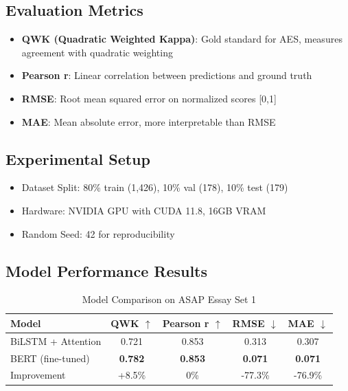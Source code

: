 \documentclass[12pt,a4paper]{article}
\begin{document}
\subsection{Evaluation Metrics}
\begin{itemize}
    \item \textbf{QWK (Quadratic Weighted Kappa)}: Gold standard for AES, measures agreement with quadratic weighting
    \item \textbf{Pearson r}: Linear correlation between predictions and ground truth
    \item \textbf{RMSE}: Root mean squared error on normalized scores [0,1]
    \item \textbf{MAE}: Mean absolute error, more interpretable than RMSE
\end{itemize}

\subsection{Experimental Setup}
\begin{itemize}
    \item Dataset Split: 80\% train (1,426), 10\% val (178), 10\% test (179)
    \item Hardware: NVIDIA GPU with CUDA 11.8, 16GB VRAM
    \item Random Seed: 42 for reproducibility
\end{itemize}

\subsection{Model Performance Results}

\begin{table}[H]
\centering
\caption{Model Comparison on ASAP Essay Set 1}
\begin{tabular}{lcccc}
\toprule
\textbf{Model} & \textbf{QWK} $\uparrow$ & \textbf{Pearson r} $\uparrow$ & \textbf{RMSE} $\downarrow$ & \textbf{MAE} $\downarrow$ \\
\midrule
BiLSTM + Attention & 0.721 & 0.853 & 0.313 & 0.307 \\
BERT (fine-tuned) & \textbf{0.782} & \textbf{0.853} & \textbf{0.071} & \textbf{0.071} \\
\midrule
Improvement & +8.5\% & 0\% & -77.3\% & -76.9\% \\
\bottomrule
\end{tabular}
\end{table}
\end{document}
